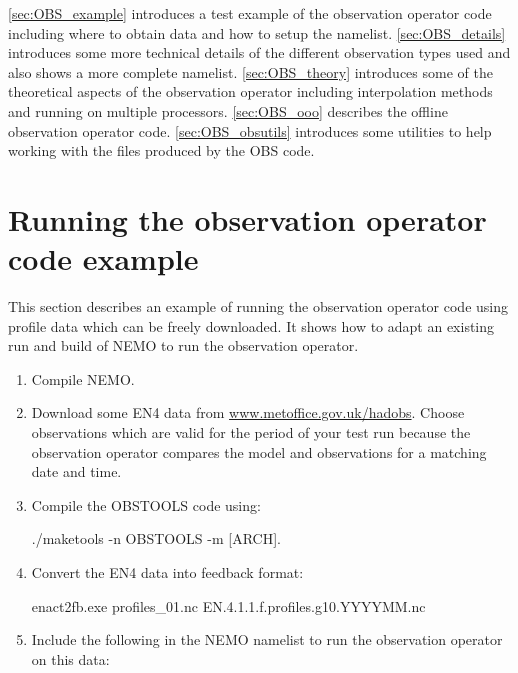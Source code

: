 \documentclass[../main/NEMO_manual]{subfiles}
\begin{document}
\autoref{sec:OBS_example} introduces a test example of the observation operator code including
where to obtain data and how to setup the namelist.
\autoref{sec:OBS_details} introduces some more technical details of the different observation types used and
also shows a more complete namelist.
\autoref{sec:OBS_theory} introduces some of the theoretical aspects of the observation operator including
interpolation methods and running on multiple processors.
\autoref{sec:OBS_ooo} describes the offline observation operator code.
\autoref{sec:OBS_obsutils} introduces some utilities to help working with the files produced by the OBS code.

\section{Running the observation operator code example}
\label{sec:OBS_example}

This section describes an example of running the observation operator code using
profile data which can be freely downloaded.
It shows how to adapt an existing run and build of NEMO to run the observation operator.

\begin{enumerate}
\item Compile NEMO.

\item Download some EN4 data from \href{http://www.metoffice.gov.uk/hadobs}{www.metoffice.gov.uk/hadobs}.
  Choose observations which are valid for the period of your test run because
  the observation operator compares the model and observations for a matching date and time. 

\item Compile the OBSTOOLS code using: 
\begin{cmds}
./maketools -n OBSTOOLS -m [ARCH].
\end{cmds}

\item Convert the EN4 data into feedback format: 
\begin{cmds}
enact2fb.exe profiles_01.nc EN.4.1.1.f.profiles.g10.YYYYMM.nc
\end{cmds}

\item Include the following in the NEMO namelist to run the observation operator on this data:
\end{enumerate}
\end{document}
